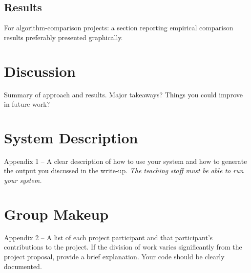 \documentclass[11pt]{article}
\begin{document}
\subsection{Results}

 For algorithm-comparison projects: a section reporting empirical comparison results preferably presented graphically.


\section{Discussion}

Summary of approach and results. Major takeaways? Things you could improve in future work?

\appendix

\section{System Description}

 Appendix 1 – A clear description of how to use your system and how to generate the output you discussed in the write-up. \emph{The teaching staff must be able to run your system.}

\section{Group Makeup}

 Appendix 2 – A list of each project participant and that
participant’s contributions to the project. If the division of work
varies significantly from the project proposal, provide a brief
explanation.  Your code should be clearly documented.





\end{document}
